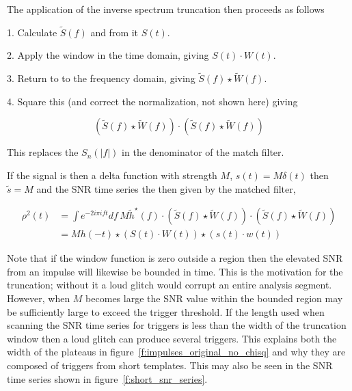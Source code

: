 The application of the inverse spectrum truncation then proceeds as
follows 

1. Calculate $\tilde{S}(f)$ and from it $S(t)$.

2. Apply the window in the time domain, giving $S(t) \cdot W(t)$.

3. Return to to the frequency domain, giving $\tilde{S}(f) \star
\tilde{W}(f)$.

4. Square this (and correct the normalization, not shown here) giving 

\begin{equation*}
(\tilde{S}(f) \star \tilde{W}(f)) \cdot (\tilde{S}(f) \star \tilde{W}(f)) 
\end{equation*}

This replaces the $S_n(|f|)$ in the denominator of the match filter.

If the signal is then a delta function with strength $M$, $s(t) = M
\delta(t)$ then $\tilde{s} = M$  and the SNR time series the then
given by the matched filter,


\begin{align*}
\rho^2(t) &= \int e^{-2 i\pi i f t} df\, M \tilde{h}^\star(f) \cdot
(\tilde{S}(f) \star \tilde{W}(f)) \cdot 
(\tilde{S}(f) \star \tilde{W}(f)) \\
&= M h(-t) \star
(S(t) \cdot W(t)) \star
(s(t) \cdot w(t))
\end{align*}

Note that if the window function is zero outside a region then the
elevated SNR from an impulse will likewise be bounded in time.  This
is the motivation for the truncation; without it a loud glitch would
corrupt an entire analysis segment.  However, when $M$ becomes large
the SNR value within the bounded region may be sufficiently large to
exceed the trigger threshold.  If the length used when scanning the
SNR time series for triggers is less than the width of the truncation
window then a loud glitch can produce several triggers.  This explains
both the width of the plateaus in
figure~\ref{f:impulses_original_no_chisq} and why they are composed of
triggers from short templates.  This may also be seen in the SNR time
series shown in figure~\ref{f:short_snr_series}.

